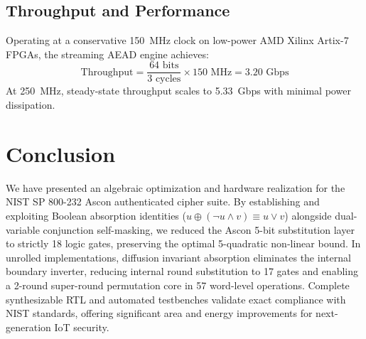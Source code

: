 \documentclass[journal,10pt]{IEEEtran}
\begin{document}
\subsection{Throughput and Performance}
Operating at a conservative 150~MHz clock on low-power AMD Xilinx Artix-7 FPGAs, the streaming AEAD engine achieves:
\begin{equation}
\text{Throughput} = \frac{64\text{ bits}}{3\text{ cycles}} \times 150\text{ MHz} = 3.20\text{ Gbps}
\end{equation}
At 250~MHz, steady-state throughput scales to 5.33~Gbps with minimal power dissipation.

\section{Conclusion}
We have presented an algebraic optimization and hardware realization for the NIST SP 800-232 Ascon authenticated cipher suite. By establishing and exploiting Boolean absorption identities ($u \oplus (\neg u \land v) \equiv u \lor v$) alongside dual-variable conjunction self-masking, we reduced the Ascon 5-bit substitution layer to strictly 18 logic gates, preserving the optimal 5-quadratic non-linear bound. In unrolled implementations, diffusion invariant absorption eliminates the internal boundary inverter, reducing internal round substitution to 17 gates and enabling a 2-round super-round permutation core in 57 word-level operations. Complete synthesizable RTL and automated testbenches validate exact compliance with NIST standards, offering significant area and energy improvements for next-generation IoT security.
\end{document}
